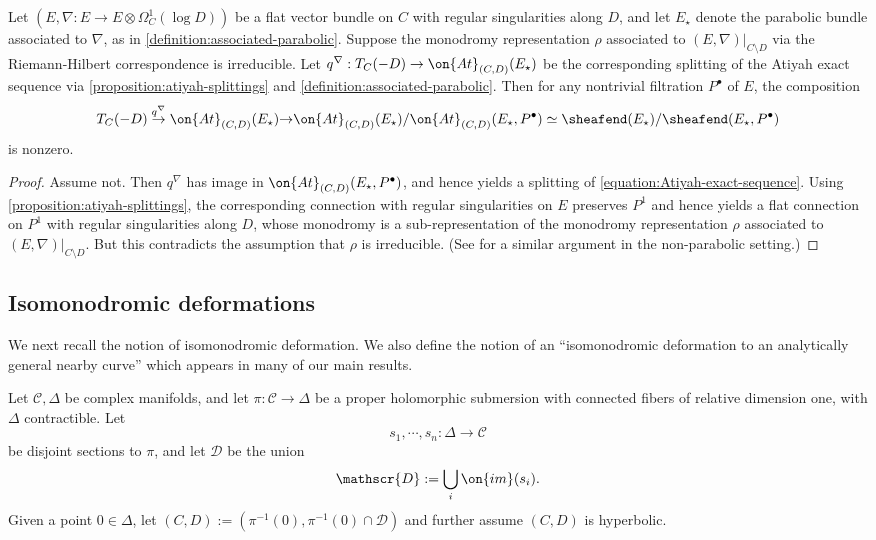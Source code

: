 \begin{proposition}
\notready
	\label{proposition:irreduciblity-splitting-condition}
    Let $(E, \nabla: {E}\to {E}\otimes \Omega^1_C(\log D))$ be a flat
    vector bundle on $C$ with regular singularities along $D$,
    and let $E_\star$ denote the parabolic bundle associated to $\nabla$, as in
    \autoref{definition:associated-parabolic}.
    Suppose the monodromy representation $\rho$
    associated to $(E, \nabla)|_{C\setminus D}$ via the Riemann-Hilbert
    correspondence is irreducible. Let $q^\nabla:
    T_C(-D)\to \on{At}_{(C,D)}(E_\star)$ be the corresponding splitting of the Atiyah
    exact sequence via \autoref{proposition:atiyah-splittings} and
    \autoref{definition:associated-parabolic}. Then for any
    nontrivial filtration $P^\bullet$ of $E$, the composition
    $$T_C(-D)\overset{q^\nabla}{\to} \on{At}_{(C,D)}(E_\star){\to}
    \on{At}_{(C,D)}(E_\star)/\on{At}_{(C,D)}(E_\star, P^\bullet)\simeq
    \sheafend(E_\star)/\sheafend(E_\star,P^\bullet)$$ is nonzero.
\end{proposition}
\begin{proof}
Assume not. Then $q^\nabla$ has image in $\on{At}_{(C,D)}(E_\star, P^\bullet)$, and
hence yields a splitting of \eqref{equation:Atiyah-exact-sequence}.
Using \autoref{proposition:atiyah-splittings},
the corresponding connection with regular singularities on $E$ preserves $P^1$ and hence yields a flat connection on $P^1$ with regular singularities along
$D$, whose monodromy is a sub-representation of the monodromy representation
$\rho$ associated to $({E}, \nabla)|_{C\setminus D}$.
But this contradicts the
assumption that $\rho$ is irreducible. (See \cite[Proof of Proposition
5.3]{BHH:logarithmic} for a similar argument in the non-parabolic setting.)
\end{proof}
\subsection{Isomonodromic deformations}
\label{subsection:isomonodromic-deformations}

We next recall the notion of  isomonodromic deformation.
We also define the notion of an ``isomonodromic deformation to an analytically
general nearby curve'' which appears in many of our main results.

\begin{notation}
\notready
	\label{notation:curve-and-sections}
	Let $\mathscr{C}, \Delta$ be complex manifolds, and let $\pi: \mathscr{C}\to \Delta$
be a proper holomorphic submersion with connected fibers of relative dimension
one, with $\Delta$ contractible.  Let $$s_1, \cdots, s_n: \Delta \to
\mathscr{C}$$ be disjoint sections to $\pi$, and let $\mathscr{D}$ be the union
$$\mathscr{D}:=\bigcup_i \on{im}(s_i).$$ Given a point $0\in \Delta$, let
$(C, D) := (\pi^{-1}(0), \pi^{-1}(0) \cap \mathscr D)$ and further assume
$(C, D)$ is hyperbolic.
\end{notation}

